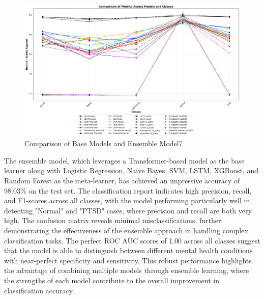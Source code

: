 \begin{figure}[h!]  
    \centering
    \includegraphics[width=1.0\textwidth]{Images/EM T RESULT.png}  
    \caption{Comparison of Base Models and Ensemble Model7}
    \label{lstm arch}  %
\end{figure}

\noindent
The ensemble model, which leverages a Transformer-based model as the base learner along with Logistic Regression, Naive Bayes, SVM, LSTM, XGBoost, and Random Forest as the meta-learner, has achieved an impressive accuracy of 98.03\% on the test set. The classification report indicates high precision, recall, and F1-scores across all classes, with the model performing particularly well in detecting "Normal" and "PTSD" cases, where precision and recall are both very high. The confusion matrix reveals minimal misclassifications, further demonstrating the effectiveness of the ensemble approach in handling complex classification tasks. The perfect ROC AUC scores of 1.00 across all classes suggest that the model is able to distinguish between different mental health conditions with near-perfect specificity and sensitivity. This robust performance highlights the advantage of combining multiple models through ensemble learning, where the strengths of each model contribute to the overall improvement in classification accuracy.

\vspace{1em}

